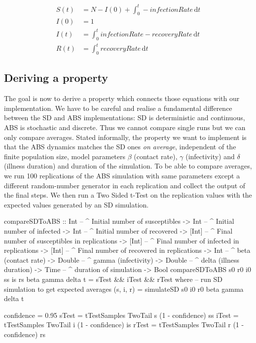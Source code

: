 \begin{align}
S(t) &= N - I(0) + \int_0^t -infectionRate\, \mathrm{d}t \\
I(0) &= 1 \\
I(t) &= \int_0^t infectionRate - recoveryRate\, \mathrm{d}t \\
R(t) &= \int_0^t recoveryRate\, \mathrm{d}t
\end{align}

\subsection{Deriving a property}
The goal is now to derive a property which connects those equations with our implementation. We have to be careful and realise a fundamental difference between the SD and ABS implementations: SD is deterministic and continuous, ABS is stochastic and discrete. Thus we cannot compare single runs but we can only compare averages. Stated informally, the property we want to implement is that the ABS dynamics matches the SD ones \textit{on average}, independent of the finite population size, model parameters $\beta$ (contact rate), $\gamma$ (infectivity) and $\delta$ (illness duration) and duration of the simulation. To be able to compare averages, we run 100 replications of the ABS simulation with same parameters except a different random-number generator in each replication and collect the output of the final steps. We then run a Two Sided t-Test on the replication values with the expected values generated by an SD simulation.

\begin{HaskellCode}
compareSDToABS :: Int    -- ^ Initial number of susceptibles
               -> Int    -- ^ Initial number of infected
               -> Int    -- ^ Initial number of recovered
               -> [Int]  -- ^ Final number of susceptibles in replications
               -> [Int]  -- ^ Final number of infected in replications
               -> [Int]  -- ^ Final number of recovered in replications
               -> Int    -- ^ beta (contact rate)
               -> Double -- ^ gamma (infectivity)
               -> Double -- ^ delta (illness duration)
               -> Time   -- ^ duration of simulation
               -> Bool
compareSDToABS s0 r0 i0
               ss is rs
               beta gamma delta t = sTest && iTest && rTest
  where
    -- run SD simulation to get expected averages
    (s, i, r) = simulateSD s0 i0 r0 beta gamma delta t
    
    confidence = 0.95
    sTest = tTestSamples TwoTail s (1 - confidence) ss
    iTest = tTestSamples TwoTail i (1 - confidence) is
    rTest = tTestSamples TwoTail r (1 - confidence) rs
\end{HaskellCode}

